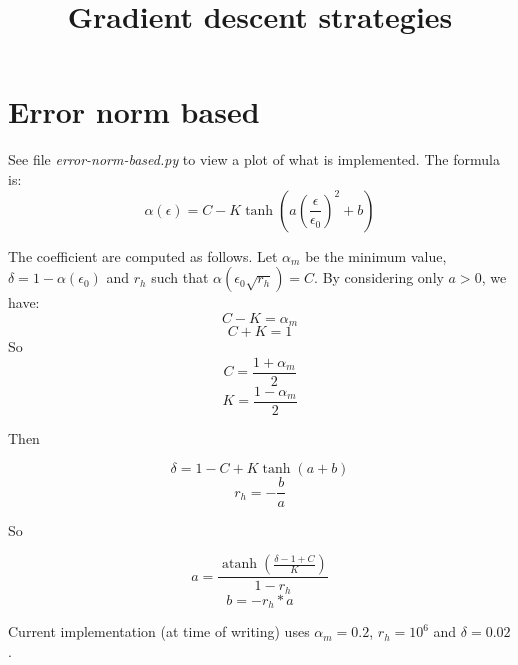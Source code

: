 \documentclass {article}
\title {Gradient descent strategies}
\newcommand{\rhalf}{r_{h}}
\newcommand{\atanh}{\operatorname{atanh}}
\begin{document}
\maketitle

\section {Error norm based}

See file \emph{error-norm-based.py} to view a plot of what is implemented.
The formula is:
$$
\alpha (\epsilon) = C - K \tanh{\left(a \left(\frac{\epsilon}{\epsilon_0}\right)^2 + b \right)}
$$

The coefficient are computed as follows. Let $\alpha_m$ be the minimum value,
$\delta = 1 - \alpha(\epsilon_0)$ and $\rhalf$ such that $\alpha(\epsilon_0 \sqrt{\rhalf}) = C$.
By considering only $a > 0$, we have:
$$ C - K = \alpha_m $$
$$ C + K = 1        $$
So
$$ C = \frac{1+\alpha_m}{2} $$
$$ K = \frac{1-\alpha_m}{2} $$

Then

$$ \delta = 1 - C + K \tanh (a+b) $$
$$ \rhalf = - \frac{b}{a} $$

So

$$ a = \frac{ \atanh \left( \frac{\delta - 1 + C}{K} \right)}{ 1 - \rhalf } $$
$$ b = - \rhalf * a $$

Current implementation (at time of writing) uses $\alpha_m = 0.2$, $\rhalf = 10^6$ and $\delta = 0.02$.
\end{document}
